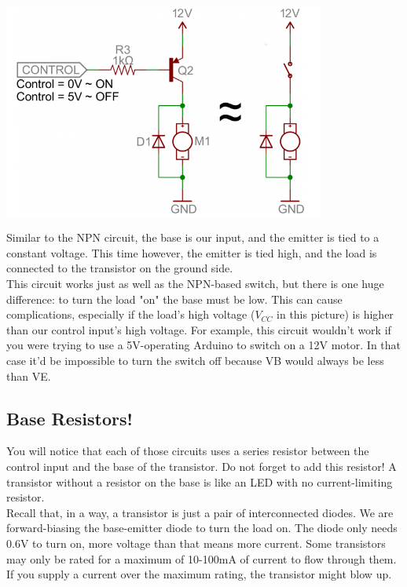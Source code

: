 \documentclass[a4paper, 11pt]{article} %
\begin{document}
\begin{center}
\includegraphics[width=300pt]{tran15}
\end{center}

Similar to the NPN circuit, the base is our input, and the emitter is tied to a constant voltage. This time however, the emitter is tied high, and the load is connected to the transistor on the ground side.\\

This circuit works just as well as the NPN-based switch, but there is one huge difference: to turn the load "on" the base must be low. This can cause complications, especially if the load's high voltage ($V_{CC}$ in this picture) is higher than our control input's high voltage. For example, this circuit wouldn't work if you were trying to use a 5V-operating Arduino to switch on a 12V motor. In that case it'd be impossible to turn the switch off because VB would always be less than VE.

\subsection*{Base Resistors!}

You will notice that each of those circuits uses a series resistor between the control input and the base of the transistor. Do not forget to add this resistor! A transistor without a resistor on the base is like an LED with no current-limiting resistor.\\

Recall that, in a way, a transistor is just a pair of interconnected diodes. We are forward-biasing the base-emitter diode to turn the load on. The diode only needs 0.6V to turn on, more voltage than that means more current. Some transistors may only be rated for a maximum of 10-100mA of current to flow through them. If you supply a current over the maximum rating, the transistor might blow up.\\
\end{document}
